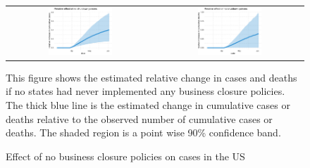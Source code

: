 \documentclass[11pt,reqno,letter]{amsart}
\theoremstyle{definition}
\begin{document}
\begin{figure}[ht]
  \caption{Effect  of no business closure policies on cases in the US  \label{fig:US-nb-dgrowth}}
  \begin{minipage}{\linewidth}
    \centering
    \begin{tabular}{cc}
%
      \includegraphics[width=0.45\textwidth]{tables_and_figures/us-index-rcumu_idx}
      & \includegraphics[width=0.45\textwidth]{tables_and_figures/us-index-rcumu_deaths_idx}
    \end{tabular}
    \begin{flushleft}
      \footnotesize This figure shows the estimated relative change in
      cases and deaths if no states had never implemented any business closure
      policies. The thick blue line is the estimated change in cumulative
      cases or deaths relative to the observed number of cumulative cases
      or deaths. The shaded region is a point wise 90\% confidence
      band.
    \end{flushleft}
  \end{minipage}
\end{figure}
\end{document}
